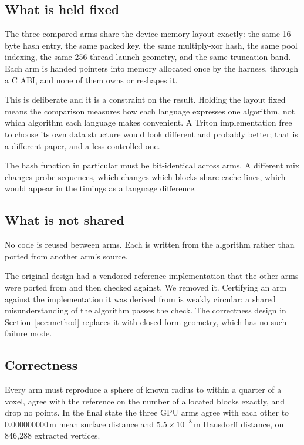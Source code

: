 \documentclass[11pt]{article}
\begin{document}
\subsection{What is held fixed}

The three compared arms share the device memory layout exactly: the same 16-byte
hash entry, the same packed key, the same multiply-xor hash, the same pool
indexing, the same 256-thread launch geometry, and the same truncation band. Each
arm is handed pointers into memory allocated once by the harness, through a C
ABI, and none of them owns or reshapes it.

This is deliberate and it is a constraint on the result. Holding the layout fixed
means the comparison measures how each language expresses one algorithm, not
which algorithm each language makes convenient. A Triton implementation free to
choose its own data structure would look different and probably better; that is a
different paper, and a less controlled one.

The hash function in particular must be bit-identical across arms. A different
mix changes probe sequences, which changes which blocks share cache lines, which
would appear in the timings as a language difference.

\subsection{What is not shared}

No code is reused between arms. Each is written from the algorithm rather than
ported from another arm's source.

The original design had a vendored reference implementation that the other arms
were ported from and then checked against. We removed it. Certifying an arm
against the implementation it was derived from is weakly circular: a shared
misunderstanding of the algorithm passes the check. The correctness design in
Section~\ref{sec:method} replaces it with closed-form geometry, which has no such
failure mode.

\subsection{Correctness}

Every arm must reproduce a sphere of known radius to within a quarter of a voxel,
agree with the reference on the number of allocated blocks exactly, and drop no
points. In the final state the three GPU arms agree with each other to
$0.000000000$\,m mean surface distance and $5.5 \times 10^{-8}$\,m Hausdorff
distance, on 846{,}288 extracted vertices.
\end{document}
